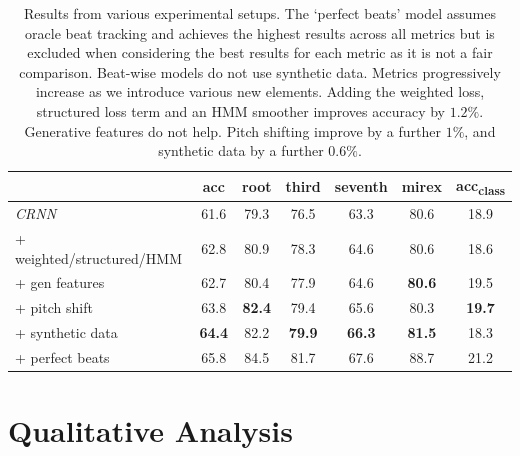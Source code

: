 \begin{table}[H]
    \centering
    \begin{tabular}{lcccccc}
        \toprule
         & acc & root & third & seventh & mirex & acc\textsubscript{class} \\
        \midrule
        \emph{CRNN}               & 61.6  & 79.3  & 76.5  & 63.3  & 80.6  & 18.9 \\
        + weighted/structured/HMM & 62.8  & 80.9  & 78.3  & 64.6  & 80.6  & 18.6 \\
        + gen features           & 62.7  & 80.4  & 77.9  & 64.6  & \textbf{80.6}  & 19.5 \\
        + pitch shift           & 63.8  & \textbf{82.4}  & 79.4  & 65.6  & 80.3  & \textbf{19.7} \\
        + synthetic data         & \textbf{64.4}  & 82.2  & \textbf{79.9}  & \textbf{66.3}  & \textbf{81.5}  & 18.3 \\
        \midrule
        + perfect beats          & 65.8  & 84.5  & 81.7  & 67.6  & 88.7  & 21.2 \\
        \bottomrule
    \end{tabular}
    \caption{Results from various experimental setups. The `perfect beats' model assumes oracle beat tracking and achieves the highest results across all metrics but is excluded when considering the best results for each metric as it is not a fair comparison. Beat-wise models do not use synthetic data. Metrics progressively increase as we introduce various new elements. Adding the weighted loss, structured loss term and an HMM smoother improves accuracy by $1.2\%$. Generative features do not help. Pitch shifting improve by a further $1\%$, and synthetic data by a further $0.6\%$.}\label{tab:test_set}
\end{table}


\section{Qualitative Analysis}
